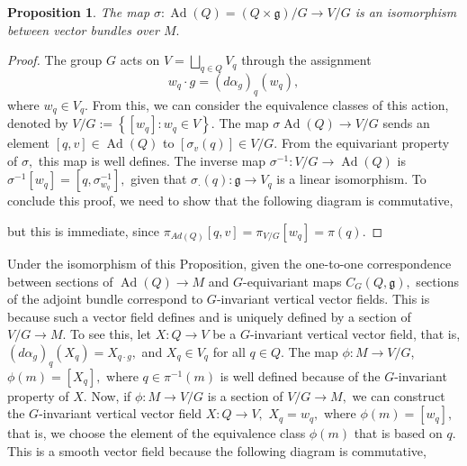 \documentclass[12pt, letterpaper, reqno]{amsart}
\theoremstyle{definition}
\theoremstyle{plain}
\newtheorem{prop}{Proposition}
\theoremstyle{remark}
\begin{document}
\begin{prop}\label{prop:isomorphism_vb}
	The map $ \sigma: \operatorname{Ad} (Q) = (Q\times \mathfrak{g})/G \rightarrow V/G $ is an isomorphism between vector bundles over $ M. $ 
\end{prop}
\begin{proof}
	The group $ G $ acts on $ V = \bigsqcup_{q\in Q}V_q $ through the assignment $$ w_q\cdot g = (d\alpha_g)_q(w_q), $$ 
	where $ w_q\in V_q. $ From this, we can consider the equivalence classes of this action, denoted by $ V/G:= \left\{ [w_q]: w_q\in V \right\}.  $ The map $ \sigma \operatorname{Ad} (Q) \rightarrow V/G $ sends an element $ [q,v]\in \operatorname{Ad} (Q) $ to $ [\sigma_v(q)]\in V/G. $ From the equivariant property of $ \sigma, $ this map is well defines. The inverse map $ \sigma^{-1} : V/G \rightarrow \operatorname{Ad}(Q) $ is $ \sigma^{-1}[w_q] = [q,\sigma^{-1}_{w_q}], $ given that $ \sigma_\cdot(q): \mathfrak{g}\rightarrow V_q $ is a linear isomorphism. To conclude this proof, we need to show that the following diagram is commutative,
	\begin{center}
	\end{center}
	but this is immediate, since $ \pi_{Ad(Q)}[q,v]=\pi_{V/G}[w_q]=\pi(q). $ 
\end{proof}
Under the isomorphism of this Proposition, given the one-to-one correspondence between sections of $ \operatorname{Ad} (Q)\rightarrow M $ and $ G $-equivariant maps $ C_G(Q, \mathfrak{g}), $ sections of the adjoint bundle correspond to $ G $-invariant vertical vector fields. This is because such a vector field defines and is uniquely defined by a section of $ V/G \rightarrow M. $ To see this, let $ X: Q \rightarrow V $ be a $ G $-invariant vertical vector field, that is, $ (d\alpha_g)_q(X_q) = X_{q\cdot g}, $ and $ X_q\in V_q $ for all $ q\in Q. $ The map $ \phi: M \rightarrow V/G $, $ \phi(m)= [X_q], $ where $ q\in \pi^{-1}(m) $ is well defined because of the $ G $-invariant property of $ X. $ Now, if $ \phi: M \rightarrow V/G $ is a section of $ V/G \rightarrow M, $ we can construct the $ G $-invariant vertical vector field $ X: Q \rightarrow V, $ $ X_q=w_q, $ where $ \phi(m)=[w_q], $ that is, we choose the element of the equivalence class $ \phi(m) $ that is based on $ q. $ This is a smooth vector field because the following diagram is commutative,
\end{document}
